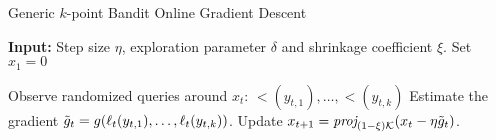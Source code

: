 \begin{algorithm} 
	\begin{algorithmic}
		\caption{Generic $k$-point Bandit Online Gradient Descent }\label{alg:generic}
		\State \textbf{Input:} Step size $\eta$, exploration parameter $\delta$ and shrinkage coefficient $\xi$.
		\State Set $x_1 = 0$
	
			\State Observe randomized queries around $x_t$: $\lt(y_{t,1}), \dots, \lt(y_{t,k})$ 
			\State Estimate the gradient $\tildegt = g(\lt(y_{t,1}), \dots, \lt(y_{t,k}))$.
			\State Update $x_{t+1} = \proj[(1-\xi)\K]{(x_t - \eta \tilde{g}_t)}$.
		\EndFor

	\end{algorithmic}
\end{algorithm}